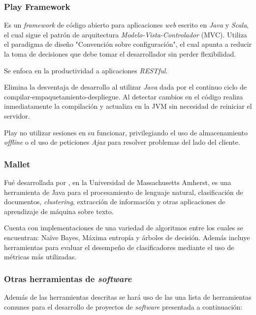 \subsubsection*{Play Framework}
\label{subsubsec:playframework}

Es un \textit{framework} de código abierto para aplicaciones \textit{web} escrito en \textit{Java} y \textit{Scala}, el cual sigue el patrón de arquitectura \textit{Modelo-Vista-Controlador} (MVC). Utiliza el paradigma de diseño "Convención sobre configuración", el cual apunta a reducir la toma de decisiones que debe tomar el desarrollador sin perder flexibilidad. 

Se enfoca en la productividad a aplicaciones \textit{RESTful}.

Elimina la desventaja de desarrollo al utilizar \textit{Java} dada por el continuo ciclo de compilar-empaquetamiento-despliegue. Al detectar cambios en el código realiza inmediatamente la compilación y actualiza en la JVM sin necesidad de reiniciar el servidor.

Play no utilizar sesiones en su funcionar, privilegiando el uso de almacenamiento \textit{offline} o el uso de peticiones \textit{Ajax} para resolver problemas del lado del cliente.

\subsubsection*{Mallet}
\label{subsubsec:mallet}

Fué desarrollada por \cite{Mallet}, en la Universidad de Massachusetts Amherst, es una herramienta de Java para el procesamiento de lenguaje natural, clasificación de documentos, \textit{clustering}, extracción de información y otras aplicaciones de aprendizaje de máquina sobre texto.

Cuenta con implementaciones de una variedad de algoritmos entre los cuales se encuentran: Naïve Bayes, Máxima entropía y árboles de decisión. Además incluye herramientas para evaluar el desempeño de clasificadores mediante el uso de métricas más utilizadas.

\subsubsection*{Otras herramientas de \textit{software}}
\label{subsubsec:herrSoft}

Además de las herramientas descritas se hará uso de las una lista de herramientas comunes para el desarrollo de proyectos de \textit{software} presentada a continuación:

